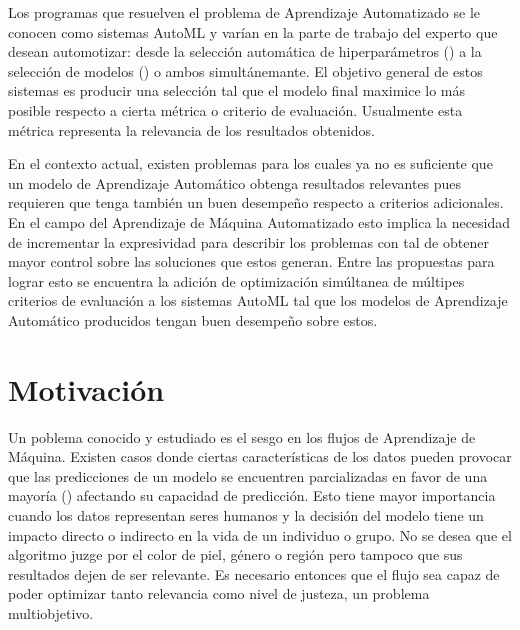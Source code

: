 Los programas que resuelven el problema de Aprendizaje Automatizado se le conocen como sistemas AutoML y var\'ian en la parte de trabajo del experto que desean automotizar: desde la selecci\'on autom\'atica de hiperpar\'ametros (\cite{feurer2019hyperparameter}) a  la selecci\'on de modelos (\cite{thornton2013auto}) o ambos  simult\'anemante. El objetivo general de estos sistemas es producir una selecci\'on tal que el modelo final maximice lo m\'as posible respecto a cierta m\'etrica o criterio de evaluaci\'on. Usualmente esta m\'etrica representa la relevancia de los resultados obtenidos.

En el contexto actual, existen problemas para los cuales ya no es suficiente que un modelo de Aprendizaje Autom\'atico obtenga resultados relevantes pues requieren que tenga tambi\'en un buen desempe\~no respecto a criterios adicionales. En el campo del Aprendizaje de M\'aquina Automatizado esto implica la necesidad de incrementar la expresividad para describir los problemas con tal de obtener mayor control sobre las soluciones que estos generan. Entre las propuestas  para lograr esto se encuentra la adici\'on  de optimizaci\'on sim\'ultanea de m\'ultipes criterios de evaluaci\'on a los sistemas AutoML  tal que los modelos de Aprendizaje Autom\'atico producidos tengan buen desempeño sobre estos.   

\section*{Motivaci\'on}
Un poblema conocido y estudiado es el sesgo en los flujos de Aprendizaje de M\'aquina. Existen casos donde ciertas caracter\'isticas de los datos pueden provocar que las predicciones de un modelo se encuentren parcializadas en favor de una mayor\'ia  (\cite{mehrabi2021survey}) afectando su capacidad de predicci\'on. Esto tiene mayor importancia cuando los datos representan seres humanos y la decisi\'on del modelo tiene un impacto directo o indirecto en la vida de un individuo o grupo. No se desea que el algoritmo juzge por el color de piel, g\'enero o regi\'on pero tampoco que sus resultados dejen de ser relevante. Es necesario entonces que el flujo sea capaz de poder optimizar tanto  relevancia como  nivel de justeza, un problema multiobjetivo.

